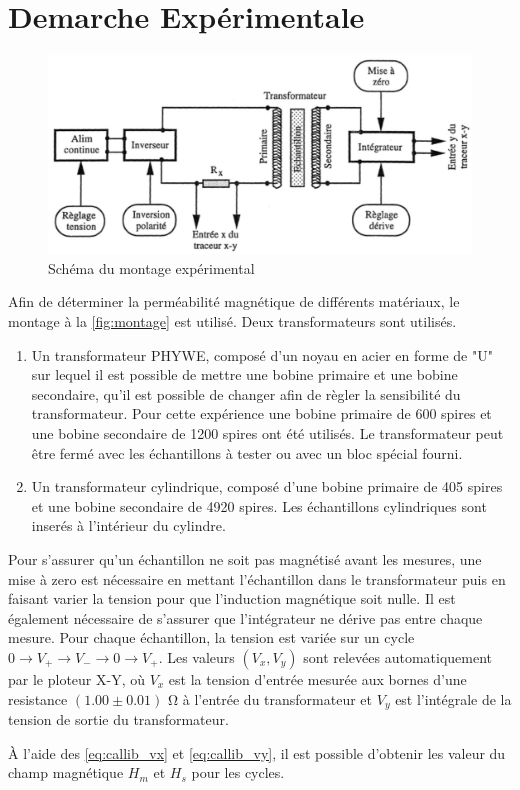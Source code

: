 \section{Demarche Expérimentale}

\begin{figure}[h]
    \centering
    \includegraphics[width=0.8\linewidth]{figures/montage.png}
    \caption{Schéma du montage expérimental \cite{notice}}
    \label{fig:montage}
\end{figure}

Afin de déterminer la perméabilité magnétique de différents matériaux, le montage à la \autoref{fig:montage} est utilisé. Deux transformateurs sont utilisés.

\begin{enumerate}
    \item Un transformateur PHYWE, composé d'un noyau en acier en forme de "U" sur lequel il est possible de mettre une bobine primaire et une bobine secondaire, qu'il est possible de changer afin de règler la sensibilité du transformateur. Pour cette expérience une bobine primaire de 600 spires et une bobine secondaire de 1200 spires ont été utilisés. Le transformateur peut être fermé avec les échantillons à tester ou avec un bloc spécial fourni.
    \item Un transformateur cylindrique, composé d'une bobine primaire de 405 spires et une bobine secondaire de 4920 spires. Les échantillons cylindriques sont inserés à l'intérieur du cylindre.
\end{enumerate}

Pour s'assurer qu'un échantillon ne soit pas magnétisé avant les mesures, une mise à zero est nécessaire en mettant l'échantillon dans le transformateur puis en faisant varier la tension pour que l'induction magnétique soit nulle. Il est également nécessaire de s'assurer que l'intégrateur ne dérive pas entre chaque mesure. Pour chaque échantillon, la tension est variée sur un cycle \(0 \rightarrow V_+ \rightarrow V_- \rightarrow 0 \rightarrow V_+\). Les valeurs \((V_x, V_y)\) sont relevées automatiquement par le ploteur X-Y, où \(V_x\) est la tension d'entrée mesurée aux bornes d'une resistance \((1.00 \pm 0.01)\) \si{\ohm} à l'entrée du transformateur et \(V_y\) est l'intégrale de la tension de sortie du transformateur.

À l'aide des \autoref{eq:callib_vx} et \autoref{eq:callib_vy}, il est possible d'obtenir les valeur du champ magnétique \(H_m\) et \(H_s\) pour les cycles.
